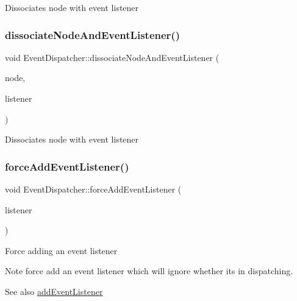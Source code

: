 Dissociates node with event listener \mbox{\label{classEventDispatcher_a43a5aaec61fcbec266dc62a50de7cbad}} 
\subsubsection{\texorpdfstring{dissociate\+Node\+And\+Event\+Listener()}{dissociateNodeAndEventListener()}\hspace{0.1cm}{\footnotesize\ttfamily [2/2]}}
{\footnotesize\ttfamily void Event\+Dispatcher\+::dissociate\+Node\+And\+Event\+Listener (\begin{DoxyParamCaption}\item[{\hyperlink{classNode}{Node} $\ast$}]{node,  }\item[{\hyperlink{classEventListener}{Event\+Listener} $\ast$}]{listener }\end{DoxyParamCaption})\hspace{0.3cm}{\ttfamily [protected]}}

Dissociates node with event listener \mbox{\label{classEventDispatcher_aaf736dd2a383a114e59be39e967fb0f3}} 
\subsubsection{\texorpdfstring{force\+Add\+Event\+Listener()}{forceAddEventListener()}\hspace{0.1cm}{\footnotesize\ttfamily [1/2]}}
{\footnotesize\ttfamily void Event\+Dispatcher\+::force\+Add\+Event\+Listener (\begin{DoxyParamCaption}\item[{\hyperlink{classEventListener}{Event\+Listener} $\ast$}]{listener }\end{DoxyParamCaption})\hspace{0.3cm}{\ttfamily [protected]}}

Force adding an event listener \begin{DoxyNote}{Note}
force add an event listener which will ignore whether it\textquotesingle{}s in dispatching. 
\end{DoxyNote}
\begin{DoxySeeAlso}{See also}
\hyperlink{classEventDispatcher_aacb9cc74f76d66952e749f2cc1519444}{add\+Event\+Listener} 
\end{DoxySeeAlso}
\mbox{\label{classEventDispatcher_aaf736dd2a383a114e59be39e967fb0f3}} 
